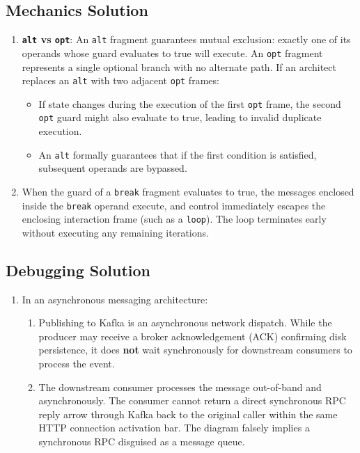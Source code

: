 \subsection*{Mechanics Solution}
\begin{enumerate}[leftmargin=18pt]
  \item \textbf{\texttt{alt} vs \texttt{opt}}: 
  An \texttt{alt} fragment guarantees mutual exclusion: exactly one of its operands whose guard evaluates to true will execute. An \texttt{opt} fragment represents a single optional branch with no alternate path. If an architect replaces an \texttt{alt} with two adjacent \texttt{opt} frames:
  \begin{itemize}
    \item If state changes during the execution of the first \texttt{opt} frame, the second \texttt{opt} guard might also evaluate to true, leading to invalid duplicate execution.
    \item An \texttt{alt} formally guarantees that if the first condition is satisfied, subsequent operands are bypassed.
  \end{itemize}
  \item When the guard of a \texttt{break} fragment evaluates to true, the messages enclosed inside the \texttt{break} operand execute, and control immediately escapes the enclosing interaction frame (such as a \texttt{loop}). The loop terminates early without executing any remaining iterations.
\end{enumerate}

\subsection*{Debugging Solution}
\begin{enumerate}[leftmargin=18pt]
  \item In an asynchronous messaging architecture:
  \begin{enumerate}
    \item Publishing to Kafka is an asynchronous network dispatch. While the producer may receive a broker acknowledgement (ACK) confirming disk persistence, it does \textbf{not} wait synchronously for downstream consumers to process the event.
    \item The downstream consumer processes the message out-of-band and asynchronously. The consumer cannot return a direct synchronous RPC reply arrow through Kafka back to the original caller within the same HTTP connection activation bar. The diagram falsely implies a synchronous RPC disguised as a message queue.
  \end{enumerate}
\end{enumerate}

